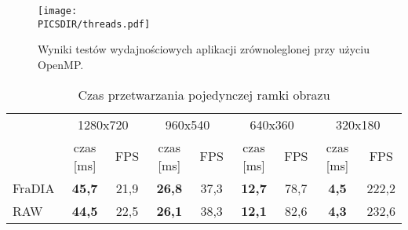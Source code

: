 \documentclass[a4paper,12pt]{article}
\def\PICSDIR{PICS}
\begin{document}
\begin{figure}
\centering
\texttt{[image: \\PICSDIR/threads.pdf]}
\caption{Wyniki testów wydajnościowych aplikacji zrównoleglonej przy użyciu OpenMP.}
\label{rys:res_omp}
\end{figure}



\begin{table}[h!]
\caption[Zadanie pierwsze -- czas przetwarzania pojedynczej ramki obrazu]{Czas przetwarzania pojedynczej ramki obrazu}
\centering
\begin{tabular}{lcccccccc}
\toprule
 & \multicolumn{2}{c}{1280x720} & \multicolumn{2}{c}{960x540} & \multicolumn{2}{c}{640x360} & \multicolumn{2}{c}{320x180} \\
\cmidrule(r){2-9}
 & czas [ms] & FPS & czas [ms] & FPS & czas [ms] & FPS & czas [ms] & FPS \\
\midrule
FraDIA & \bf 45,7 & 21,9 & \bf 26,8 & 37,3 & \bf 12,7 & 78,7 & \bf 4,5 & 222,2 \\
RAW    & \bf 44,5 & 22,5 & \bf 26,1 & 38,3 & \bf 12,1 & 82,6 & \bf 4,3 & 232,6 \\
\bottomrule
\end{tabular}
\label{tab:zad_1_wyniki}
\end{table}
\end{document}
